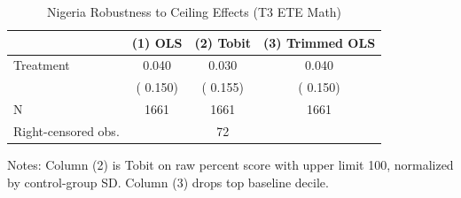\begin{table}[!htbp]
\centering
\caption{Nigeria Robustness to Ceiling Effects (T3 ETE Math)}
\label{tab:ng_ceiling}
\begin{threeparttable}
\begin{tabular}[t]{lccc}
\toprule
 & (1) OLS & (2) Tobit & (3) Trimmed OLS \\
\midrule
Treatment &   0.040 &   0.030 &   0.040 \\
 & (  0.150) & (  0.155) & (  0.150) \\
\addlinespace
N & 1661 & 1661 & 1661 \\
Right-censored obs. & & 72 & \\
\bottomrule
\end{tabular}
\begin{tablenotes}[para]
\item Notes: Column (2) is Tobit on raw percent score with upper limit 100, normalized by control\mbox{-}group SD. Column (3) drops top baseline decile.
\end{tablenotes}
\end{threeparttable}
\end{table}
